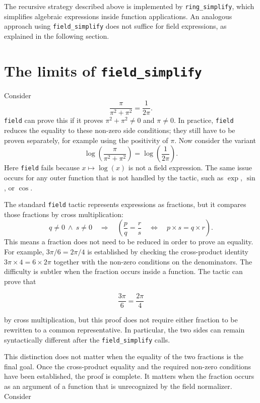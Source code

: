 \documentclass[11pt]{article}
\begin{document}
The recursive strategy described above is implemented by \texttt{ring\_simplify}, which simplifies algebraic expressions inside function applications. An analogous approach using \texttt{field\_simplify} does not suffice for field expressions, as explained in the following section.

\section{The limits of {\tt field\_simplify}}
Consider
\[
  \frac{\pi}{\pi^2+\pi^2}=\frac{1}{2\pi}.
\]
\texttt{field} can prove this if it proves $\pi^2+\pi^2\ne0$ and
$\pi\ne0$.
In practice, \texttt{field} reduces the equality to these non-zero side conditions; they still have to be proven separately, for example using the positivity of
$\pi$.
Now consider the variant
\[
  \log\!\left(\frac{\pi}{\pi^2+\pi^2}\right)
  = \log\!\left(\frac{1}{2\pi}\right).
\]
Here \texttt{field} fails because $x\mapsto\log(x)$ is not a field
expression. The same issue occurs for any outer function that is not handled by the tactic, such as $\exp$, $\sin$, or $\cos$.


The standard \texttt{field} tactic represents expressions as fractions, but it compares those fractions by cross multiplication:
\[
  q\ne0\ \land\ s\ne0
  \quad\Longrightarrow\quad
  \left(\frac{p}{q}=\frac{r}{s}
  \quad\Longleftrightarrow\quad
  p\times s=q\times r\right).
\]
This means a fraction does not need to be reduced in order to prove an equality.
For example, $3\pi/6=2\pi/4$ is established by checking the cross-product
identity $3\pi\times4=6\times2\pi$ together with the non-zero conditions on the
denominators.
The difficulty is subtler when the fraction occurs inside a function. The
tactic can prove that

$$
  \frac{3\pi}{6}=\frac{2\pi}{4}
$$

by cross multiplication, but this proof does not require either fraction to
be rewritten to a common representative. In particular, the two sides can
remain syntactically different after the \texttt{field\_simplify} calls.

This distinction does not matter when the equality of the two fractions is
the final goal. Once the cross-product equality and the required non-zero
conditions have been established, the proof is complete. It matters when the
fraction occurs as an argument of a function that is unrecognized by the field
normalizer. Consider
\end{document}

